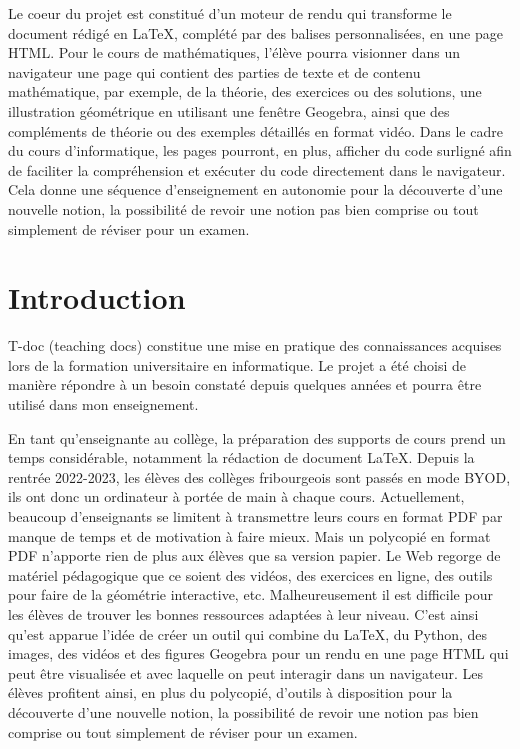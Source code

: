 \documentclass[12pt,titlepage,oneside]{article}
\renewcommand{\footnote}[1]{}
\begin{document}
Le coeur du projet est constitué d'un moteur de rendu qui transforme le document rédigé en LaTeX, complété par des balises personnalisées, en une page HTML.  Pour le cours de mathématiques, l'élève pourra visionner dans un navigateur une page qui contient des parties de texte et de contenu mathématique, par exemple, de la théorie, des exercices ou des solutions, une illustration géométrique en utilisant une fenêtre Geogebra, ainsi que des compléments de théorie ou des exemples détaillés en format vidéo. Dans le cadre du cours d'informatique, les pages pourront, en plus, afficher du code surligné afin de faciliter la compréhension et exécuter du code directement dans le navigateur. Cela donne une séquence d'enseignement en autonomie pour la découverte d'une nouvelle notion, la possibilité de revoir une notion pas bien comprise ou tout simplement de réviser pour un examen.

\newpage

\tableofcontents
\thispagestyle{empty}

\clearpage

\setcounter{page}{1}
\section*{Introduction}
T-doc (teaching docs) constitue une mise en pratique des connaissances acquises lors de la formation universitaire en informatique. Le projet a été choisi de manière répondre à un besoin constaté depuis quelques années et pourra être utilisé dans mon enseignement.\par

En tant qu'enseignante au collège, la préparation des supports de cours prend un temps considérable, notamment la rédaction de document LaTeX. Depuis la rentrée 2022-2023, les élèves des collèges fribourgeois sont passés en mode BYOD\footnote{Bring Your Own Device}, ils ont donc un ordinateur à portée de main à chaque cours. Actuellement, beaucoup d'enseignants se limitent à transmettre leurs cours en format PDF par manque de temps et de motivation à faire mieux. Mais un polycopié en format PDF n'apporte rien de plus aux élèves que sa version papier. Le Web regorge de matériel pédagogique que ce soient des vidéos, des exercices en ligne, des outils pour faire de la géométrie interactive, etc. Malheureusement il est difficile pour les élèves de trouver les bonnes ressources adaptées à leur niveau. C'est ainsi qu'est apparue l'idée de créer un outil qui combine du LaTeX, du Python, des images, des vidéos et des figures Geogebra pour un rendu en une page HTML qui peut être visualisée et avec laquelle on peut interagir dans un navigateur. Les élèves profitent ainsi, en plus du polycopié, d'outils à disposition pour la découverte d'une nouvelle notion, la possibilité de revoir une notion pas bien comprise ou tout simplement de réviser pour un examen.\par
\end{document}
